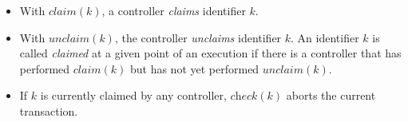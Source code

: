 \documentclass[conference]{sigcomm-alternate}
\newcommand{\Nat}{\mathbb{N}}
\newcommand{\claimcheck}{check\xspace}
\newcommand{\compare}{compare\xspace}
\newcommand{\petr}[1]{\textit{\textcolor{blue}{[petr]: #1}}} %
\begin{document}
\begin{itemize}
\item With $\textit{claim}(k)$,
a controller %
\emph{claims}  identifier $k$.

\item With $\textit{unclaim}(k)$, %
the controller %
  \emph{unclaims} identifier $k$.
An identifier $k$ is called \emph{claimed} at a given point of an
execution if there is a controller that has performed $\textit{claim}(k)$
but has not yet performed  $\textit{unclaim}(k)$.

\item If $k$ is currently claimed by any controller,
$\textit{\claimcheck}(k)$ %
aborts the current transaction.

\end{itemize}

\end{document}
